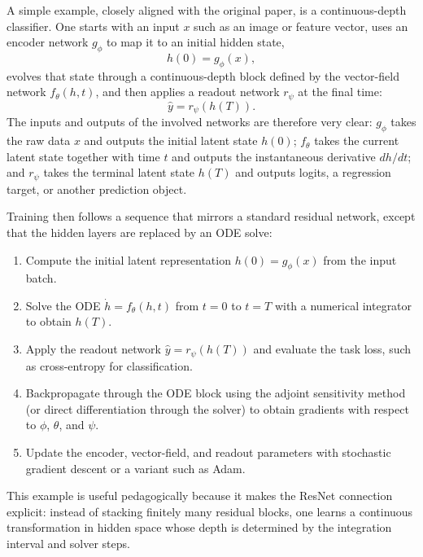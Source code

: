 \documentclass[11pt]{article}
\begin{document}
A simple example, closely aligned with the original paper, is a continuous-depth classifier. One starts with an input $x$ such as an image or feature vector, uses an encoder network $g_\phi$ to map it to an initial hidden state,
\begin{equation}
h(0) = g_\phi(x),
\end{equation}
evolves that state through a continuous-depth block defined by the vector-field network $f_\theta(h,t)$, and then applies a readout network $r_\psi$ at the final time:
\begin{equation}
\hat y = r_\psi(h(T)).
\end{equation}
The inputs and outputs of the involved networks are therefore very clear: $g_\phi$ takes the raw data $x$ and outputs the initial latent state $h(0)$; $f_\theta$ takes the current latent state together with time $t$ and outputs the instantaneous derivative $dh/dt$; and $r_\psi$ takes the terminal latent state $h(T)$ and outputs logits, a regression target, or another prediction object.

Training then follows a sequence that mirrors a standard residual network, except that the hidden layers are replaced by an ODE solve:
\begin{enumerate}
\item Compute the initial latent representation $h(0)=g_\phi(x)$ from the input batch.
\item Solve the ODE $\dot h = f_\theta(h,t)$ from $t=0$ to $t=T$ with a numerical integrator to obtain $h(T)$.
\item Apply the readout network $\hat y = r_\psi(h(T))$ and evaluate the task loss, such as cross-entropy for classification.
\item Backpropagate through the ODE block using the adjoint sensitivity method (or direct differentiation through the solver) to obtain gradients with respect to $\phi$, $\theta$, and $\psi$.
\item Update the encoder, vector-field, and readout parameters with stochastic gradient descent or a variant such as Adam.
\end{enumerate}
This example is useful pedagogically because it makes the ResNet connection explicit: instead of stacking finitely many residual blocks, one learns a continuous transformation in hidden space whose depth is determined by the integration interval and solver steps.
\end{document}
